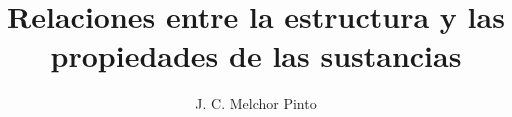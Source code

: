 \documentclass[12pt,addpoints,answers]{guia}
\title{Relaciones entre la estructura y las propiedades de las sustancias}
\author{J. C. Melchor Pinto}
\begin{document}
\pagestyle{headandfoot}

\INFO
\printanswers
\begin{multicols}{2}
    
\end{multicols}



\end{document}
